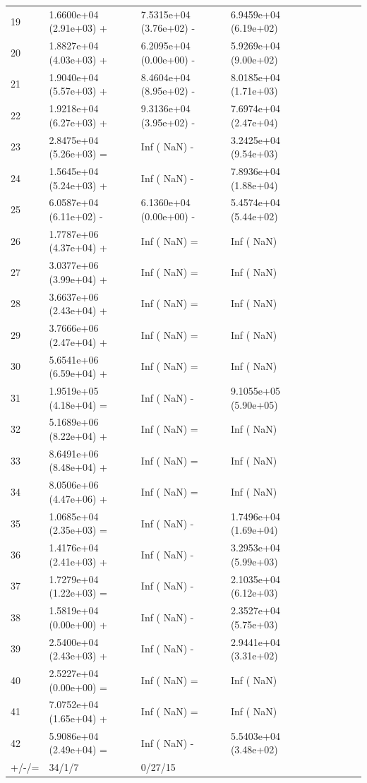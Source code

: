 \documentclass[11pt]{article}
\begin{document}
\begin{table}[htbp]
{\begin{tabular}{lllllllll}
19    & 1.6600e+04 (2.91e+03) + & 7.5315e+04 (3.76e+02) - & 6.9459e+04 (6.19e+02) \\
20    & 1.8827e+04 (4.03e+03) + & 6.2095e+04 (0.00e+00) - & 5.9269e+04 (9.00e+02) \\
21    & 1.9040e+04 (5.57e+03) + & 8.4604e+04 (8.95e+02) - & 8.0185e+04 (1.71e+03) \\
22    & 1.9218e+04 (6.27e+03) + & 9.3136e+04 (3.95e+02) - & 7.6974e+04 (2.47e+04) \\
23    & 2.8475e+04 (5.26e+03) = & Inf (     NaN) -        & 3.2425e+04 (9.54e+03) \\
24    & 1.5645e+04 (5.24e+03) + & Inf (     NaN) -        & 7.8936e+04 (1.88e+04) \\
25    & 6.0587e+04 (6.11e+02) - & 6.1360e+04 (0.00e+00) - & 5.4574e+04 (5.44e+02) \\
26    & 1.7787e+06 (4.37e+04) + & Inf (     NaN) =        & Inf (     NaN)        \\
27    & 3.0377e+06 (3.99e+04) + & Inf (     NaN) =        & Inf (     NaN)        \\
28    & 3.6637e+06 (2.43e+04) + & Inf (     NaN) =        & Inf (     NaN)        \\
29    & 3.7666e+06 (2.47e+04) + & Inf (     NaN) =        & Inf (     NaN)        \\
30    & 5.6541e+06 (6.59e+04) + & Inf (     NaN) =        & Inf (     NaN)        \\
31    & 1.9519e+05 (4.18e+04) = & Inf (     NaN) -        & 9.1055e+05 (5.90e+05) \\
32    & 5.1689e+06 (8.22e+04) + & Inf (     NaN) =        & Inf (     NaN)        \\
33    & 8.6491e+06 (8.48e+04) + & Inf (     NaN) =        & Inf (     NaN)        \\
34    & 8.0506e+06 (4.47e+06) + & Inf (     NaN) =        & Inf (     NaN)        \\
35    & 1.0685e+04 (2.35e+03) = & Inf (     NaN) -        & 1.7496e+04 (1.69e+04) \\
36    & 1.4176e+04 (2.41e+03) + & Inf (     NaN) -        & 3.2953e+04 (5.99e+03) \\
37    & 1.7279e+04 (1.22e+03) = & Inf (     NaN) -        & 2.1035e+04 (6.12e+03) \\
38    & 1.5819e+04 (0.00e+00) + & Inf (     NaN) -        & 2.3527e+04 (5.75e+03) \\
39    & 2.5400e+04 (2.43e+03) + & Inf (     NaN) -        & 2.9441e+04 (3.31e+02) \\
40    & 2.5227e+04 (0.00e+00) = & Inf (     NaN) =        & Inf (     NaN)        \\
41    & 7.0752e+04 (1.65e+04) + & Inf (     NaN) =        & Inf (     NaN)        \\
42    & 5.9086e+04 (2.49e+04) = & Inf (     NaN) -        & 5.5403e+04 (3.48e+02) \\
\hline
+/-/= & 34/1/7                  & 0/27/15                 & \multicolumn{1}{l}{} 
\\
\hline
\end{tabular}
}
\end{table}
\end{document}
